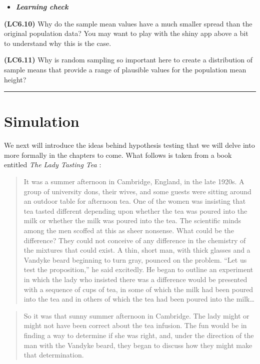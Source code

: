 \documentclass[]{tufte-book}
\let\oldrule=\rule
\renewcommand{\rule}[1]{\oldrule{\linewidth}}
\newenvironment{rmdblock}[1]
  {\begin{shaded*}
  \begin{itemize}
  \renewcommand{\labelitemi}{
    \raisebox{-.7\height}[0pt][0pt]{
    }
  }
  \item
  }
  {
  \end{itemize}
  \end{shaded*}
  }
\newenvironment{learncheck}
  {\begin{rmdblock}{warning}}
  {\end{rmdblock}}
\theoremstyle{definition}
\theoremstyle{definition}
\theoremstyle{remark}
\begin{document}
\begin{learncheck}
\textbf{\emph{Learning check}}
\end{learncheck}

\textbf{(LC6.10)} Why do the sample mean values have a much smaller
spread than the original population data? You may want to play with the
shiny app above a bit to understand why this is the case.

\textbf{(LC6.11)} Why is random sampling so important here to create a
distribution of sample means that provide a range of plausible values
for the population mean height?

\begin{center}\rule{0.5\linewidth}{\linethickness}\end{center}

\section{Simulation}\label{simulation}

We next will introduce the ideas behind hypothesis testing that we will
delve into more formally in the chapters to come. What follows is taken
from a book entitled \emph{The Lady Tasting Tea} \citep{salsburg2001}:

\begin{quote}
It was a summer afternoon in Cambridge, England, in the late 1920s. A
group of university dons, their wives, and some guests were sitting
around an outdoor table for afternoon tea. One of the women was
insisting that tea tasted different depending upon whether the tea was
poured into the milk or whether the milk was poured into the tea. The
scientific minds among the men scoffed at this as sheer nonsense. What
could be the difference? They could not conceive of any difference in
the chemistry of the mixtures that could exist. A thin, short man, with
thick glasses and a Vandyke beard beginning to turn gray, pounced on the
problem. ``Let us test the proposition,'' he said excitedly. He began to
outline an experiment in which the lady who insisted there was a
difference would be presented with a sequence of cups of tea, in some of
which the milk had been poured into the tea and in others of which the
tea had been poured into the milk\ldots{}
\end{quote}

\begin{quote}
So it was that sunny summer afternoon in Cambridge. The lady might or
might not have been correct about the tea infusion. The fun would be in
finding a way to determine if she was right, and, under the direction of
the man with the Vandyke beard, they began to discuss how they might
make that determination.
\end{quote}
\end{document}
